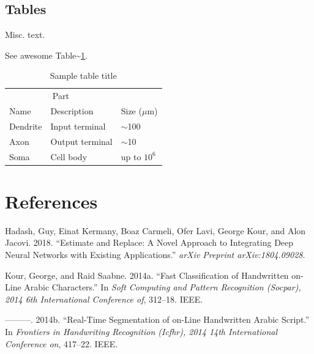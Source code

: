 \documentclass{article}
\begin{document}
\hypertarget{tables}{%
\subsection{Tables}\label{tables}}

Misc. text.

See awesome Table\textasciitilde{}\ref{tab:table}.

\begin{table}
 \caption{Sample table title}
  \centering
  \begin{tabular}{lll}
    \toprule
    \multicolumn{2}{c}{Part}                   \\
    \cmidrule(r){1-2}
    Name     & Description     & Size ($\mu$m) \\
    \midrule
    Dendrite & Input terminal  & $\sim$100     \\
    Axon     & Output terminal & $\sim$10      \\
    Soma     & Cell body       & up to $10^6$  \\
    \bottomrule
  \end{tabular}
  \label{tab:table}
\end{table}

\hypertarget{references}{%
\section*{References}\label{references}}

\hypertarget{refs}{}
\leavevmode\hypertarget{ref-hadash2018estimate}{}%
Hadash, Guy, Einat Kermany, Boaz Carmeli, Ofer Lavi, George Kour, and
Alon Jacovi. 2018. ``Estimate and Replace: A Novel Approach to
Integrating Deep Neural Networks with Existing Applications.''
\emph{arXiv Preprint arXiv:1804.09028}.

\leavevmode\hypertarget{ref-kour2014fast}{}%
Kour, George, and Raid Saabne. 2014a. ``Fast Classification of
Handwritten on-Line Arabic Characters.'' In \emph{Soft Computing and
Pattern Recognition (Socpar), 2014 6th International Conference of},
312--18. IEEE.

\leavevmode\hypertarget{ref-kour2014real}{}%
---------. 2014b. ``Real-Time Segmentation of on-Line Handwritten Arabic
Script.'' In \emph{Frontiers in Handwriting Recognition (Icfhr), 2014
14th International Conference on}, 417--22. IEEE.



\end{document}
